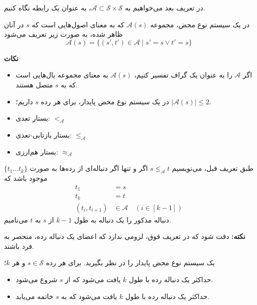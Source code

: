در تعریف بعد می‌خواهیم به
$\mathcal{A} \subset \mathcal{S} \times \mathcal{S}$،
به عنوان یک رابطه نگاه کنیم.

\begin{defn}
در یک سیستم نوع محض، مجموعه
$\mathcal{A}(s)$
که به معنای اصول‌هایی است که
$s$
در آنان ظاهر شده، به صورت زیر تعریف می‌شود
\begin{equation*}
\mathcal{A}(s) = \{(s',t') \in \mathcal{A} \mid s' = s \lor t' = s\}
\end{equation*}
\end{defn}

\textbf{نکات}
\begin{itemize}
\item اگر
$\mathcal{A}$
را به عنوان یک گراف تفسیر کنیم،
$\mathcal{A}(s)$
به معنای مجموعه یال‌هایی است که به
$s$
متصل هستند.
\item در یک سیستم نوع محض پایدار، برای هر رده $s$ داریم؛ $\mid \mathcal{A}(s) \mid \leq 2$.
\end{itemize}

\begin{defn}
\hfill
\begin{itemize}
\item بستار تعدی: $<_\mathcal{A}$
\item بستار بازتابی-تعدی: $\le_\mathcal{A}$
\item بستار هم‌ارزی: $\approx_\mathcal{A}$
\end{itemize}
\end{defn}

\begin{defn}
طبق تعریف قبل، می‌نویسیم
$s \le_\mathcal{A} t$
اگر و تنها اگر دنباله‌ای از رده‌ها به صورت
$\{t_1 \dots t_k\}$
موجود باشد که
\begin{align*}
t_1 &= s\\
t_k &= t\\
(t_i,t_{i+1}) &\in \mathcal{A} \quad (i \in [k-1])
\end{align*}
دنباله مذکور را یک دنباله به طول
$k-1$
از
$s$
به
$t$
می‌نامیم.
\end{defn}

\textbf{نکته:}
دقت شود که در تعریف فوق، لزومی ندارد که اعضای یک دنباله رده، منحصر به فرد باشند.

\begin{prop}
یک سیستم نوع محض پایدار را در نظر بگیرید. برای هر رده
$s \in \mathcal{S}$
و هر
$k$؛
\begin{itemize}
\item حداکثر یک دنباله رده با طول
$k$
یافت می‌شود که از
$s$
شروع می‌شود.
\item حداکثر یک دنباله رده با طول
$k$
یافت می‌شود که به
$s$
خاتمه می‌یابد.
\end{itemize}
\end{prop}

